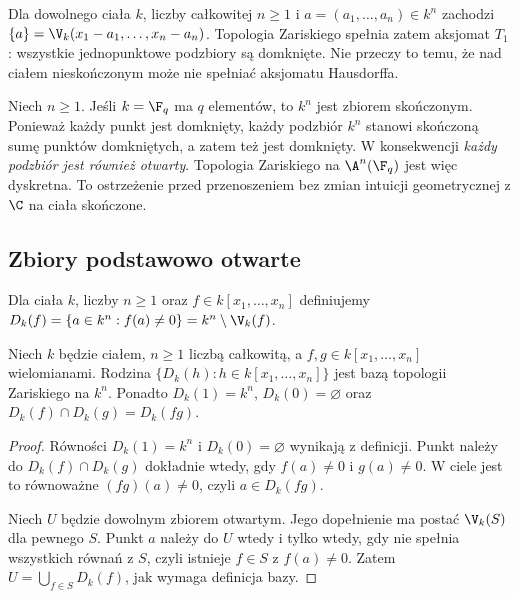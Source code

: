 \begin{przyklad}
Dla dowolnego ciała $k$, liczby całkowitej $n\ge1$
i $a=(a_1,\dots,a_n)\in k^n$
zachodzi $\{a\}=\V_k(x_1-a_1,\dots,x_n-a_n)$.
Topologia Zariskiego spełnia zatem aksjomat $T_1$: wszystkie
jednopunktowe podzbiory są domknięte. Nie przeczy to temu, że
nad ciałem nieskończonym może nie spełniać aksjomatu Hausdorffa.
\end{przyklad}

\begin{przyklad}
Niech $n\ge1$. Jeśli $k=\F_q$ ma $q$ elementów, to $k^n$ jest zbiorem skończonym.
Ponieważ każdy punkt jest domknięty, każdy podzbiór $k^n$
stanowi skończoną sumę punktów domkniętych, a zatem też jest domknięty.
W konsekwencji \emph{każdy podzbiór jest również otwarty}.
Topologia Zariskiego na $\A^n(\F_q)$ jest więc dyskretna.
To ostrzeżenie przed przenoszeniem bez zmian intuicji geometrycznej
z $\C$ na ciała skończone.
\end{przyklad}

\subsection{Zbiory podstawowo otwarte}

\begin{definicja}
Dla ciała $k$, liczby $n\ge1$ oraz $f\in k[x_1,\dots,x_n]$
definiujemy $D_k(f)=\{a\in k^n:f(a)\ne0\}=k^n\setminus\V_k(f)$.
\end{definicja}

\begin{stwierdzenie}
Niech $k$ będzie ciałem, $n\ge1$ liczbą całkowitą,
a $f,g\in k[x_1,\dots,x_n]$ wielomianami.
Rodzina $\{D_k(h):h\in k[x_1,\dots,x_n]\}$ jest bazą topologii
Zariskiego na $k^n$. Ponadto $D_k(1)=k^n$, $D_k(0)=\varnothing$
oraz $D_k(f)\cap D_k(g)=D_k(fg)$.
\end{stwierdzenie}
\begin{proof}
Równości $D_k(1)=k^n$ i $D_k(0)=\varnothing$ wynikają z definicji.
Punkt należy do $D_k(f)\cap D_k(g)$ dokładnie wtedy,
gdy $f(a)\ne0$ i $g(a)\ne0$. W ciele jest to równoważne
$(fg)(a)\ne0$, czyli $a\in D_k(fg)$.

Niech $U$ będzie dowolnym zbiorem otwartym.
Jego dopełnienie ma postać $\V_k(S)$ dla pewnego $S$.
Punkt $a$ należy do $U$ wtedy i tylko wtedy, gdy nie spełnia
wszystkich równań z $S$, czyli istnieje $f\in S$ z $f(a)\ne0$.
Zatem $U=\bigcup_{f\in S}D_k(f)$, jak wymaga definicja bazy.
\end{proof}

